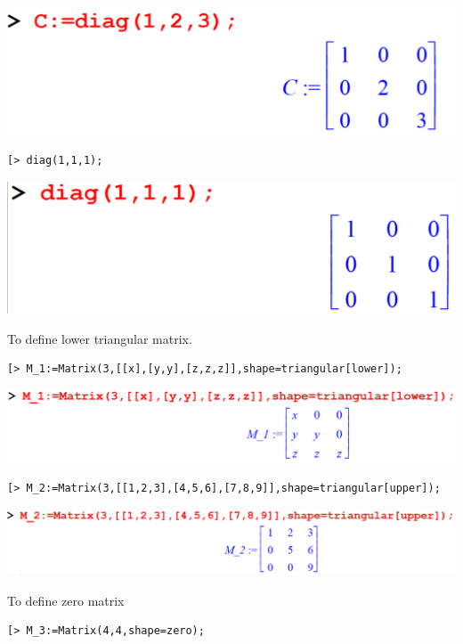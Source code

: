 \documentclass[
]{book}
\theoremstyle{definition}
\theoremstyle{definition}
\theoremstyle{definition}
\theoremstyle{definition}
\theoremstyle{remark}
\begin{document}
\includegraphics{figures/Lesson 4/fig16.png}

\begin{verbatim}
[> diag(1,1,1);
\end{verbatim}

\includegraphics{figures/Lesson 4/fig17.png}

To define lower triangular matrix.

\begin{verbatim}
[> M_1:=Matrix(3,[[x],[y,y],[z,z,z]],shape=triangular[lower]);
\end{verbatim}

\includegraphics{figures/Lesson 4/fig18.png}

\begin{verbatim}
[> M_2:=Matrix(3,[[1,2,3],[4,5,6],[7,8,9]],shape=triangular[upper]);
\end{verbatim}

\includegraphics{figures/Lesson 4/fig19.png}

To define zero matrix

\begin{verbatim}
[> M_3:=Matrix(4,4,shape=zero);
\end{verbatim}
\end{document}
